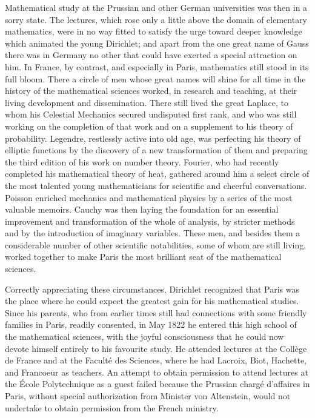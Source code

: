\documentclass[11pt]{article}
\begin{document}
Mathematical study at the Prussian and other German universities was then in a sorry state. The lectures, which rose only a little above the domain of elementary mathematics, were in no way fitted to satisfy the urge toward deeper knowledge which animated the young Dirichlet; and apart from the one great name of Gauss there was in Germany no other that could have exerted a special attraction on him. In France, by contrast, and especially in Paris, mathematics still stood in its full bloom. There a circle of men whose great names will shine for all time in the history of the mathematical sciences worked, in research and teaching, at their living development and dissemination. There still lived the great Laplace, to whom his Celestial Mechanics secured undisputed first rank, and who was still working on the completion of that work and on a supplement to his theory of probability. Legendre, restlessly active into old age, was perfecting his theory of elliptic functions by the discovery of a new transformation of them and preparing the third edition of his work on number theory. Fourier, who had recently completed his mathematical theory of heat, gathered around him a select circle of the most talented young mathematicians for scientific and cheerful conversations. Poisson enriched mechanics and mathematical physics by a series of the most valuable memoirs. Cauchy was then laying the foundation for an essential improvement and transformation of the whole of analysis, by stricter methods and by the introduction of imaginary variables. These men, and besides them a considerable number of other scientific notabilities, some of whom are still living, worked together to make Paris the most brilliant seat of the mathematical sciences.

Correctly appreciating these circumstances, Dirichlet recognized that Paris was the place where he could expect the greatest gain for his mathematical studies. Since his parents, who from earlier times still had connections with some friendly families in Paris, readily consented, in May 1822 he entered this high school of the mathematical sciences, with the joyful consciousness that he could now devote himself entirely to his favourite study. He attended lectures at the Collège de France and at the Faculté des Sciences, where he had Lacroix, Biot, Hachette, and Francoeur as teachers. An attempt to obtain permission to attend lectures at the École Polytechnique as a guest failed because the Prussian chargé d'affaires in Paris, without special authorization from Minister von Altenstein, would not undertake to obtain permission from the French ministry.
\end{document}
